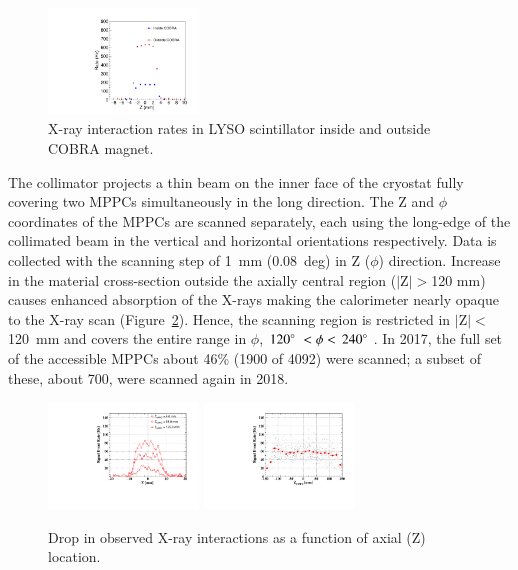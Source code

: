 \begin{figure}[]
\centering
\includegraphics[width=4cm]{plots/xray_cobra_absorption}
\caption{X-ray
interaction rates in LYSO scintillator inside and outside COBRA magnet.
} \label{fig:absorption} 
\end{figure}  


The collimator projects a thin beam on the inner face of the cryostat
fully covering two MPPCs simultaneously in the long direction.  The Z
and $\phi$ coordinates of the MPPCs are scanned separately, each using
the long-edge of the collimated beam in the vertical and horizontal
orientations respectively. Data is collected with the scanning step of
1~mm (0.08~deg) in Z ($\phi$) direction.  Increase in the material
cross-section outside the axially central region ($|$Z$|>$120 mm)
causes enhanced absorption of the X-rays making the calorimeter nearly
opaque to the X-ray scan (Figure~\ref{fig:ratevsz}).  Hence, the scanning
region is restricted in $|$Z$|<$120~mm and covers the entire range in
$\phi$, $120\mathrm{^{\circ}\hspace{1mm}}<\phi<\,240\mathrm{^{\circ}\hspace{1mm}}$.  In 2017, the full set of the
accessible MPPCs about 46\% (1900 of 4092) were scanned; a subset of
these, about 700, were scanned again in 2018.

\begin{figure}[] 
\includegraphics[width=4cm]{plots/ratevsz2}
\includegraphics[width=4cm]{plots/ratevsz1} \caption{Drop in
observed X-ray interactions as a function of axial (Z)  location.}
\label{fig:ratevsz} 
\end{figure}  




